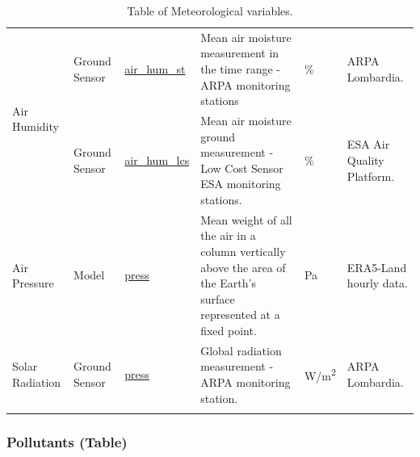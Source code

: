 \begin{center}
\begin{longtable}{ |p{2cm}|p{1.5cm}|p{2.3cm}|p{4cm}|p{1cm}|p{2cm}| }
\multirow{2}{4em}{Air Humidity} & Ground \newline Sensor  & \underline{air\_hum\_st} & Mean air moisture measurement in the time range - ARPA monitoring stations & \% & ARPA \newline Lombardia.\\ 
& Ground \newline Sensor  & \underline{air\_hum\_lcs} &  Mean air moisture ground measurement - Low Cost Sensor ESA monitoring stations. & \% & ESA Air Quality Platform.\\ \hline

\multirow{1}{4em}{Air Pressure} & Model   & \underline{press} & Mean weight of all the air in a column vertically above the area of the Earth's surface represented at a fixed point. & Pa & ERA5-Land hourly data.\\ \hline

\multirow{1}{4em}{Solar Radiation} & Ground \newline Sensor  & \underline{press} & Global radiation measurement - ARPA monitoring station. & W/m\textsuperscript{2} & ARPA \newline Lombardia.\\ \hline

\hline
\caption{Table of Meteorological variables.}

\end{longtable}
\end{center}

\subsubsection{Pollutants (Table)}


